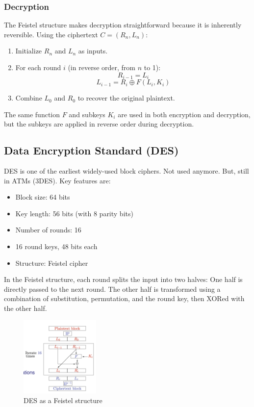 \subsubsection{Decryption}

The Feistel structure makes decryption straightforward because it is inherently reversible. Using the ciphertext \( C = (R_n, L_n) \):

\begin{enumerate}
    \item Initialize \( R_n \) and \( L_n \) as inputs.
    \item For each round \( i \) (in reverse order, from \( n \) to 1):
    \[
    R_{i-1} = L_i
    \]
    \[
    L_{i-1} = R_i \oplus F(L_i, K_i)
    \]
    \item Combine \( L_0 \) and \( R_0 \) to recover the original plaintext.
\end{enumerate}

The same function \( F \) and subkeys \( K_i \) are used in both encryption and decryption, but the subkeys are applied in reverse order during decryption.

\subsection{Data Encryption Standard (DES)}
DES is one of the earliest widely-used block ciphers. Not used anymore. But, still in ATMs (3DES). Key features are:

\begin{itemize}
    \item Block size: 64 bits
    \item Key length: 56 bits (with 8 parity bits)
    \item Number of rounds: 16
    \item 16 round keys, 48 bits each
    \item Structure: Feistel cipher
\end{itemize}

In the Feistel structure, each round splits the input into two halves: One half is directly passed to the next round. The other half is transformed using a combination of substitution, permutation, and the round key, then XORed with the other half.

\begin{figure}[h!]
    \centering
    \includegraphics[width=0.35\textwidth]{img/des.png}
    \caption{DES as a Feistel structure}
    \label{fig:des}
\end{figure}


